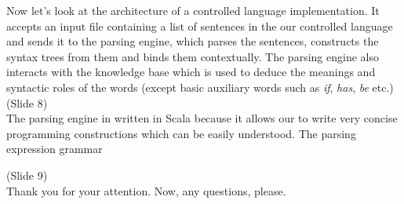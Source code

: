 \documentclass{article}
\begin{document}
Now let's look at the architecture of a controlled language implementation.
It accepts an input file containing a list of sentences in the our controlled language and sends it to the parsing engine,
which parses the sentences, constructs the syntax trees from them and binds them contextually. The parsing engine
also interacts with the knowledge base which is used to deduce the meanings and syntactic roles of the words (except basic
auxiliary words such as \textit{if}, \textit{has}, \textit{be} etc.)\\

(Slide 8)\\

The parsing engine in written in Scala because it allows our to write very concise programming constructions which can be 
easily understood.
The parsing expression grammar 

(Slide 9)\\

Thank you for your attention. Now, any questions, please.
\end{document}
